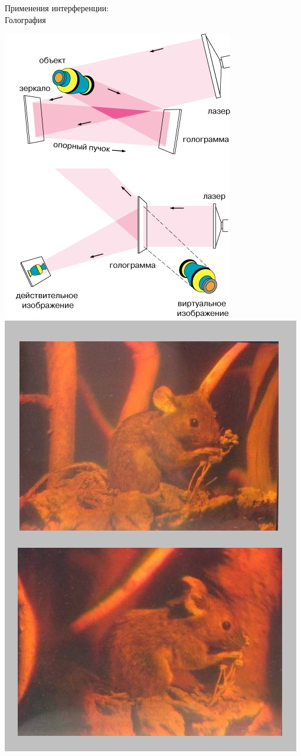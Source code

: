 \documentclass[usenames,dvipsnames,pdftex,unicode,hidelinks]{beamer}
\begin{document}
  \begin{frame}{Применения интерференции:\\ Голография}
    \begin{center}
      \includegraphics[height=0.6\textheight]{holography}
      \hspace{5mm}
      \includegraphics[height=0.6\textheight]{holomouse}

\end{center}
\end{frame}
\end{document}
